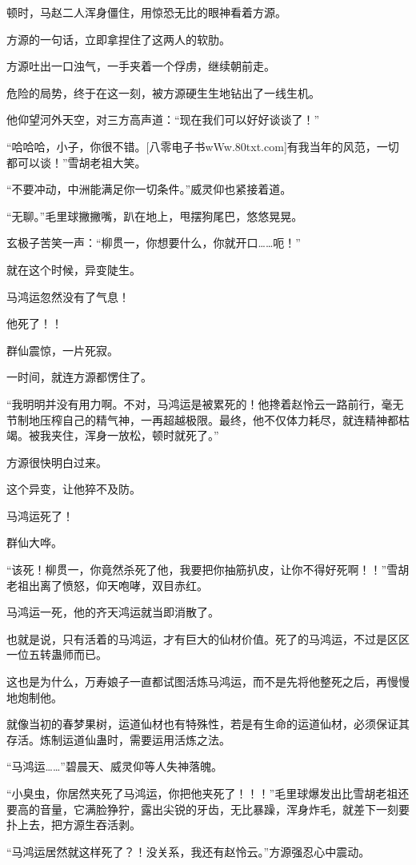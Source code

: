 \begin{this_body}
顿时，马赵二人浑身僵住，用惊恐无比的眼神看着方源。

方源的一句话，立即拿捏住了这两人的软肋。

方源吐出一口浊气，一手夹着一个俘虏，继续朝前走。

危险的局势，终于在这一刻，被方源硬生生地钻出了一线生机。

他仰望河外天空，对三方高声道：“现在我们可以好好谈谈了！”

“哈哈哈，小子，你很不错。[八零电子书wWw.80txt.com]有我当年的风范，一切都可以谈！”雪胡老祖大笑。

“不要冲动，中洲能满足你一切条件。”威灵仰也紧接着道。

“无聊。”毛里球撇撇嘴，趴在地上，甩摆狗尾巴，悠悠晃晃。

玄极子苦笑一声：“柳贯一，你想要什么，你就开口……呃！”

就在这个时候，异变陡生。

马鸿运忽然没有了气息！

他死了！！

群仙震惊，一片死寂。

一时间，就连方源都愣住了。

“我明明并没有用力啊。不对，马鸿运是被累死的！他搀着赵怜云一路前行，毫无节制地压榨自己的精气神，一再超越极限。最终，他不仅体力耗尽，就连精神都枯竭。被我夹住，浑身一放松，顿时就死了。”

方源很快明白过来。

这个异变，让他猝不及防。

马鸿运死了！

群仙大哗。

“该死！柳贯一，你竟然杀死了他，我要把你抽筋扒皮，让你不得好死啊！！”雪胡老祖出离了愤怒，仰天咆哮，双目赤红。

马鸿运一死，他的齐天鸿运就当即消散了。

也就是说，只有活着的马鸿运，才有巨大的仙材价值。死了的马鸿运，不过是区区一位五转蛊师而已。

这也是为什么，万寿娘子一直都试图活炼马鸿运，而不是先将他整死之后，再慢慢地炮制他。

就像当初的春梦果树，运道仙材也有特殊性，若是有生命的运道仙材，必须保证其存活。炼制运道仙蛊时，需要运用活炼之法。

“马鸿运……”碧晨天、威灵仰等人失神落魄。

“小臭虫，你居然夹死了马鸿运，你把他夹死了！！！”毛里球爆发出比雪胡老祖还要高的音量，它满脸狰狞，露出尖锐的牙齿，无比暴躁，浑身炸毛，就差下一刻要扑上去，把方源生吞活剥。

“马鸿运居然就这样死了？！没关系，我还有赵怜云。”方源强忍心中震动。


\end{this_body}

